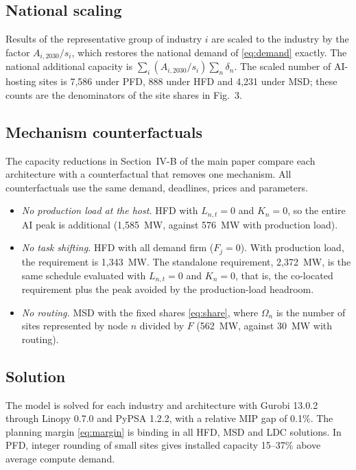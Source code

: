 \documentclass[11pt]{article}
\begin{document}
\subsection*{National scaling}
Results of the representative group of industry $i$ are scaled to the industry by the factor $A_{i,2030}/s_i$, which restores the national demand of \eqref{eq:demand} exactly. The national additional capacity is $\sum_i (A_{i,2030}/s_i)\sum_n\delta_n$. The scaled number of AI-hosting sites is 7,586 under PFD, 888 under HFD and 4,231 under MSD; these counts are the denominators of the site shares in Fig.~3.

\subsection*{Mechanism counterfactuals}
The capacity reductions in Section~IV-B of the main paper compare each architecture with a counterfactual that removes one mechanism. All counterfactuals use the same demand, deadlines, prices and parameters.
\begin{itemize}
\item \emph{No production load at the host.} HFD with $L_{n,t}=0$ and $K_n=0$, so the entire AI peak is additional (1,585~MW, against 576~MW with production load).
\item \emph{No task shifting.} HFD with all demand firm ($F_j=0$). With production load, the requirement is 1,343~MW. The standalone requirement, 2,372~MW, is the same schedule evaluated with $L_{n,t}=0$ and $K_n=0$, that is, the co-located requirement plus the peak avoided by the production-load headroom.
\item \emph{No routing.} MSD with the fixed shares \eqref{eq:share}, where $\Omega_n$ is the number of sites represented by node $n$ divided by $F$ (562~MW, against 30~MW with routing).
\end{itemize}

\subsection*{Solution}
The model is solved for each industry and architecture with Gurobi 13.0.2 through Linopy 0.7.0 and PyPSA 1.2.2, with a relative MIP gap of 0.1\%. The planning margin \eqref{eq:margin} is binding in all HFD, MSD and LDC solutions. In PFD, integer rounding of small sites gives installed capacity 15--37\% above average compute demand.

\clearpage
\end{document}
